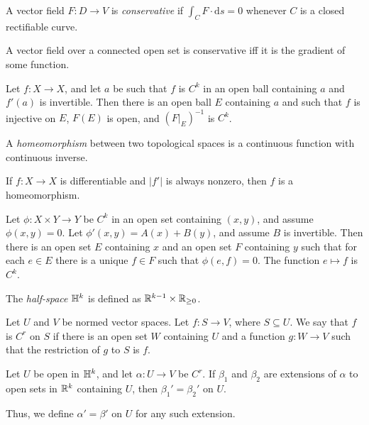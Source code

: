 \begin{defn}
    A vector field $F:D\to V$ is \emph{conservative} if $\int_C F\cdot\mathrm ds=0$
    whenever $C$ is a closed rectifiable curve.
\end{defn}
\begin{cor}
    A vector field over a connected open set is conservative iff it is the
    gradient of some function.
\end{cor}
\begin{thm}
    Let $f:X\to X$, and let $a$ be such that $f$ is $C^k$ in an open ball
    containing $a$ and $f'(a)$ is invertible.
    Then there is an open ball $E$ containing $a$ and such that $f$ is injective on
    $E$, $F(E)$ is open, and $(F|_E)^{-1}$ is $C^k$.
\end{thm}
\begin{defn}
    A \emph{homeomorphism} between two topological spaces is a continuous
    function with continuous inverse.
\end{defn}
\begin{cor}
    If $f:X\to X$ is differentiable and $|f'|$ is always nonzero, then $f$ is a
    homeomorphism.
\end{cor}
\begin{thm}
    Let $\phi:X\times Y\to Y$ be $C^k$ in an open set containing $(x,y)$, and
    assume $\phi(x,y)=0$. Let $\phi'(x,y)=A(x)+B(y)$, and assume $B$ is invertible.
    Then there is an open set $E$ containing $x$ and an open set $F$ containing
    $y$ such that for each $e\in E$ there is a unique $f\in F$ such that
    $\phi(e,f)=0$. The function $e\mapsto f$ is $C^k$.
\end{thm}
\begin{defn}
    The \emph{half-space} $\mathbb{H}^k$ is defined as $\mathbb{R}^{k-1}\times\mathbb{R}_{\ge 0}$.
\end{defn}
\begin{defn}
    Let $U$ and $V$ be normed vector spaces.
    Let $f:S\to V$, where $S\subseteq U$. We say that $f$ is $C^r$ on $S$ if
    there is an open set $W$ containing $U$ and a function $g:W\to V$ such that
    the restriction of $g$ to $S$ is $f$.
\end{defn}
\begin{prop}
    Let $U$ be open in $\mathbb{H}^k$, and let $\alpha:U\to V$ be $C^r$. If $\beta_1$
    and $\beta_2$ are extensions of $\alpha$ to open sets in $\mathbb{R}^k$ containing
    $U$, then $\beta_1'=\beta_2'$ on $U$.
\end{prop}
\begin{defn}
    Thus, we define $\alpha'=\beta'$ on $U$ for any such extension.
\end{defn}

